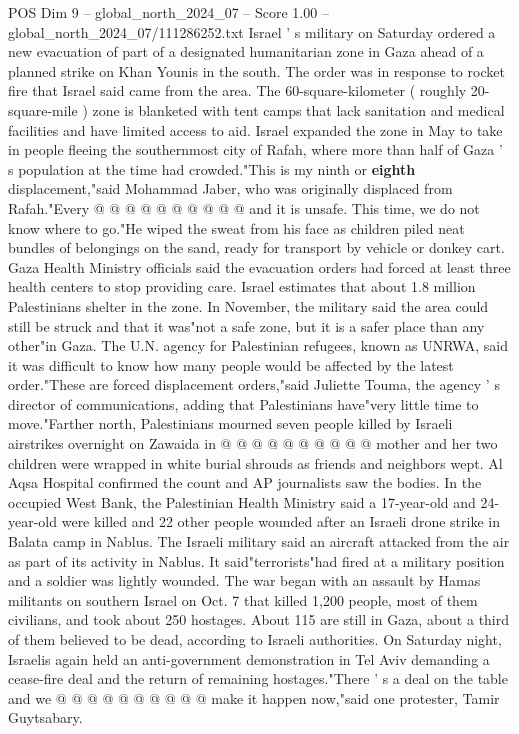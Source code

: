 \begin{textsample}{POS Dim 9 – global\_north\_2024\_07 – Score 1.00 – global\_north\_2024\_07/111286252.txt}
Israel ' s military on Saturday ordered a new evacuation of part of a designated humanitarian zone in Gaza ahead of a planned strike on Khan Younis in the south.
The order was in response to rocket fire that Israel said came from the area.
The 60-square-kilometer ( roughly 20-square-mile ) zone is blanketed with tent camps that lack sanitation and medical facilities and have limited access to aid.
Israel expanded the zone in May to take in people fleeing the southernmost city of Rafah, where more than half of Gaza ' s population at the time had crowded."This is my ninth or \textbf{eighth} displacement,"said Mohammad Jaber, who was originally displaced from Rafah."Every @ @ @ @ @ @ @ @ @ @ and it is unsafe.
This time, we do not know where to go."He wiped the sweat from his face as children piled neat bundles of belongings on the sand, ready for transport by vehicle or donkey cart.
Gaza Health Ministry officials said the evacuation orders had forced at least three health centers to stop providing care.
Israel estimates that about 1.8 million Palestinians shelter in the zone.
In November, the military said the area could still be struck and that it was"not a safe zone, but it is a safer place than any other"in Gaza.
The U.N. agency for Palestinian refugees, known as UNRWA, said it was difficult to know how many people would be affected by the latest order."These are forced displacement orders,"said Juliette Touma, the agency ' s director of communications, adding that Palestinians have"very little time to move."Farther north, Palestinians mourned seven people killed by Israeli airstrikes overnight on Zawaida in @ @ @ @ @ @ @ @ @ @ mother and her two children were wrapped in white burial shrouds as friends and neighbors wept.
Al Aqsa Hospital confirmed the count and AP journalists saw the bodies.
In the occupied West Bank, the Palestinian Health Ministry said a 17-year-old and 24-year-old were killed and 22 other people wounded after an Israeli drone strike in Balata camp in Nablus.
The Israeli military said an aircraft attacked from the air as part of its activity in Nablus.
It said"terrorists"had fired at a military position and a soldier was lightly wounded.
The war began with an assault by Hamas militants on southern Israel on Oct. 7 that killed 1,200 people, most of them civilians, and took about 250 hostages.
About 115 are still in Gaza, about a third of them believed to be dead, according to Israeli authorities.
On Saturday night, Israelis again held an anti-government demonstration in Tel Aviv demanding a cease-fire deal and the return of remaining hostages."There ' s a deal on the table and we @ @ @ @ @ @ @ @ @ @ make it happen now,"said one protester, Tamir Guytsabary.

\end{textsample}
